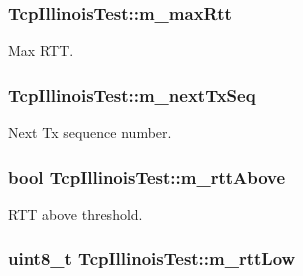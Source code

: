 \subsubsection[{\texorpdfstring{m\+\_\+max\+Rtt}{m_maxRtt}}]{ Tcp\+Illinois\+Test\+::m\+\_\+max\+Rtt\hspace{0.3cm}{\ttfamily [private]}}\hypertarget{classTcpIllinoisTest_a4c60297baed9b939d21297582b71ab85}{}\label{classTcpIllinoisTest_a4c60297baed9b939d21297582b71ab85}


Max R\+TT. 

\subsubsection[{\texorpdfstring{m\+\_\+next\+Tx\+Seq}{m_nextTxSeq}}]{ Tcp\+Illinois\+Test\+::m\+\_\+next\+Tx\+Seq\hspace{0.3cm}{\ttfamily [private]}}\hypertarget{classTcpIllinoisTest_a4dc91af5ef7f4fb09603dd130d8d3fdb}{}\label{classTcpIllinoisTest_a4dc91af5ef7f4fb09603dd130d8d3fdb}


Next Tx sequence number. 

\subsubsection[{\texorpdfstring{m\+\_\+rtt\+Above}{m_rttAbove}}]{\setlength{\rightskip}{0pt plus 5cm}bool Tcp\+Illinois\+Test\+::m\+\_\+rtt\+Above\hspace{0.3cm}{\ttfamily [private]}}\hypertarget{classTcpIllinoisTest_aa1955bfc6f0c531c5340f656cfbcebf0}{}\label{classTcpIllinoisTest_aa1955bfc6f0c531c5340f656cfbcebf0}


R\+TT above threshold. 

\subsubsection[{\texorpdfstring{m\+\_\+rtt\+Low}{m_rttLow}}]{\setlength{\rightskip}{0pt plus 5cm}uint8\+\_\+t Tcp\+Illinois\+Test\+::m\+\_\+rtt\+Low\hspace{0.3cm}{\ttfamily [private]}}\hypertarget{classTcpIllinoisTest_a778939c4eb1decc6b08488b49edf517c}{}\label{classTcpIllinoisTest_a778939c4eb1decc6b08488b49edf517c}


